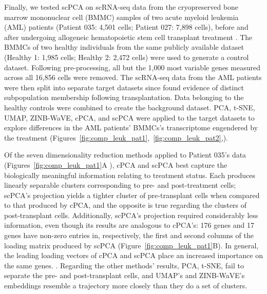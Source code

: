 Finally, we tested scPCA on scRNA-seq data from the cryopreserved bone marrow mononuclear cell (BMMC) samples of two acute myeloid leukemia (AML) patients (Patient 035: 4,501 cells; Patient 027: 7,898 cells), before and after undergoing allogeneic hematopoietic stem cell transplant treatment \citep{Zheng2017}. The BMMCs of two healthy individuals from the same publicly available dataset (Healthy 1: 1,985 cells; Healthy 2: 2,472 cells) were used to generate a control dataset. Following pre-processing, all but the 1,000 most variable genes measured across all 16,856 cells were removed. The scRNA-seq data from the AML patients were then split into separate target datasets since \citet{Zheng2017} found evidence of distinct subpopulation membership following transplantation. Data belonging to the healthy controls were combined to create the background dataset. PCA, t-SNE, UMAP, ZINB-WaVE,  cPCA, and scPCA were applied to the target datasets to explore differences in the AML patients' BMMCs's transcriptome engendered by the treatment (Figures~\ref{fig:comp_leuk_pat1},~\ref{fig:comp_leuk_pat2},).

Of the seven dimensionality reduction methods applied to Patient 035's data (Figures~\ref{fig:comp_leuk_pat1}A ), cPCA and scPCA best capture the biologically meaningful information relating to treatment status. Each produces linearly separable clusters corresponding to pre- and post-treatment cells; scPCA's projection yields a tighter cluster of pre-transplant cells when compared to that produced by cPCA, and the opposite is true regarding the clusters of post-transplant cells. Additionally, scPCA's projection required considerably less information, even though its results are analogous to cPCA's: 176 genes and 17 genes have non-zero entries in, respectively, the first and second columns of the loading matrix produced by scPCA (Figure~\ref{fig:comp_leuk_pat1}B). In general, the leading loading vectors of cPCA and scPCA place an increased importance on the same genes. . Regarding the other methods' results, PCA, t-SNE,  fail to separate the pre- and post-transplant cells, and UMAP's and ZINB-WaVE's embeddings resemble a trajectory more closely than they do a set of clusters.


